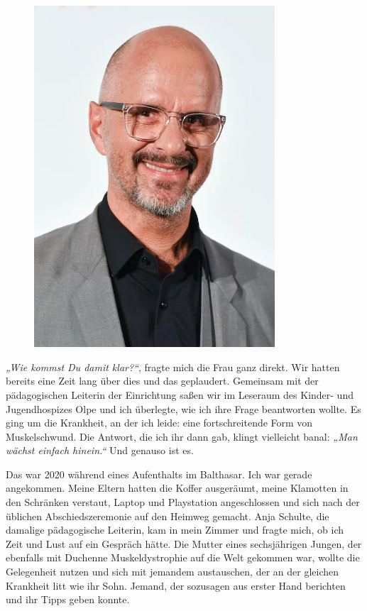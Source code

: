 \documentclass[fontsize=14pt,a4paper,headinclude,DIV=calc,automark]{scrbook}
\begin{document}
\begin{figure}[ht] %
    \centering %
    \includegraphics[width=0.8\textwidth]{Fotos/ChristophMariaHerbst.jpg}
    \label{fig:ChristophMariaHerbst} %
\end{figure}


\textit{„Wie kommst Du damit klar?“}, fragte mich die Frau ganz direkt. Wir hatten bereits eine Zeit lang über dies und das geplaudert. Gemeinsam mit der pädagogischen Leiterin der Einrichtung saßen wir im Leseraum des Kinder- und Jugendhospizes Olpe und ich überlegte, wie ich ihre Frage beantworten wollte. Es ging um die Krankheit, an der ich leide: eine fortschreitende Form von Muskelschwund. Die Antwort, die ich ihr dann gab, klingt vielleicht banal: \textit{„Man wächst einfach hinein.“} Und genauso ist es.

Das war 2020 während eines Aufenthalts im Balthasar. Ich war gerade angekommen. Meine Eltern hatten die Koffer ausgeräumt, meine Klamotten in den Schränken verstaut, Laptop und Playstation angeschlossen und sich nach der üblichen Abschiedszeremonie auf den Heimweg gemacht. Anja Schulte, die damalige pädagogische Leiterin, kam in mein Zimmer und fragte mich, ob ich Zeit und Lust auf ein Gespräch hätte. Die Mutter eines sechsjährigen Jungen, der ebenfalls mit Duchenne Muskeldystrophie auf die Welt gekommen war, wollte die Gelegenheit nutzen und sich mit jemandem austauschen, der an der gleichen Krankheit litt wie ihr Sohn. Jemand, der sozusagen aus erster Hand berichten und ihr Tipps geben konnte.
\end{document}
